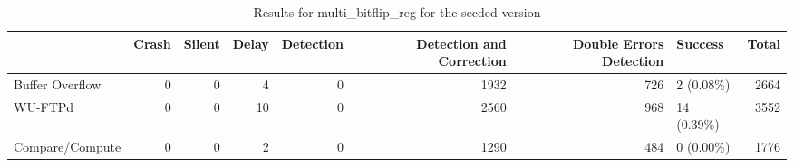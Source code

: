 \begin{table}[t]
	\centering
	\caption{Results for multi_bitflip_reg for the secded version}
	\label{table:end_sim_by_status_secded_3_multi_bitflip_reg}
	\begin{tabular}{lrrrrrrlr}
		\toprule
		                & Crash & Silent & Delay & Detection & Detection and Correction & Double Errors Detection & Success     & Total \\
		\midrule
		Buffer Overflow & 0     & 0      & 4     & 0         & 1932                     & 726                     & 2 (0.08\%)  & 2664  \\
		WU-FTPd         & 0     & 0      & 10    & 0         & 2560                     & 968                     & 14 (0.39\%) & 3552  \\
		Compare/Compute & 0     & 0      & 2     & 0         & 1290                     & 484                     & 0 (0.00\%)  & 1776  \\
		\bottomrule
	\end{tabular}
\end{table}
